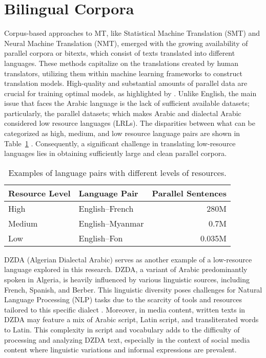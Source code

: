 \section{Bilingual Corpora}\label{start5.1}
Corpus-based approaches to MT, like Statistical Machine Translation (SMT) and Neural Machine Translation (NMT), emerged with the growing availability of parallel corpora or bitexts, which consist of texts translated into different languages. 
These methods capitalize on the translations created by human translators, utilizing them within machine learning frameworks to construct translation models. 
High-quality and substantial amounts of parallel data are crucial for training optimal models, as highlighted by \cite{koehn17, lample18}. 
Unlike English, the main issue that faces the Arabic language is the lack of sufficient available datasets; particularly, the parallel datasets; which makes Arabic and dialectal Arabic considered low resource languages (LRLs). The disparities between what can be categorized as high, medium, and low resource language pairs are shown in Table~\ref{tab:LRL} \cite{haddow22}.
Consequently, a significant challenge in translating low-resource languages lies in obtaining sufficiently large and clean parallel corpora.
\begin{table}[]
	\centering
	\begin{tabular}{ l l r } 
		\hline
		Resource Level & Language Pair & Parallel Sentences \\
		\hline
		High & English–French & 280M \\
		Medium & English–Myanmar & 0.7M \\ 
		Low & English–Fon & 0.035M \\ 
		\hline
	\end{tabular}
	\caption{Examples of language pairs with different levels of resources.}
	\label{tab:LRL}
\end{table}

DZDA (Algerian Dialectal Arabic) serves as another example of a low-resource language explored in this research. 
DZDA, a variant of Arabic predominantly spoken in Algeria, is heavily influenced by various linguistic sources, including French, Spanish, and Berber. 
This linguistic diversity poses challenges for Natural Language Processing (NLP) tasks due to the scarcity of tools and resources tailored to this specific dialect \cite{samih17}. 
Moreover, in media content, written texts in DZDA may feature a mix of Arabic script, Latin script, and transliterated words to Latin. 
This complexity in script and vocabulary adds to the difficulty of processing and analyzing DZDA text, especially in the context of social media content where linguistic variations and informal expressions are prevalent.

